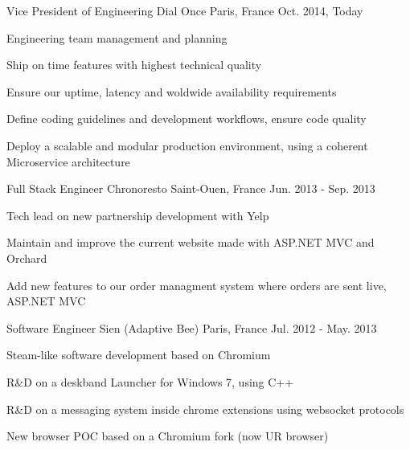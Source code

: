 

\begin{cventries}

  \cventry
    {Vice President of Engineering} %
    {Dial Once} %
    {Paris, France} %
    {Oct. 2014, Today} %
    {
      \begin{cvitems} %
        \item {Engineering team management and planning}
        \item {Ship on time features with highest technical quality}
        \item {Ensure our uptime, latency and woldwide availability requirements}
        \item {Define coding guidelines and development workflows, ensure code quality}
        \item {Deploy a scalable and modular production environment, using a coherent Microservice architecture}
      \end{cvitems}
    }

  \cventry
    {Full Stack Engineer} %
    {Chronoresto} %
    {Saint-Ouen, France} %
    {Jun. 2013 - Sep. 2013} %
    {
      \begin{cvitems} %
        \item {Tech lead on new partnership development with Yelp}
        \item {Maintain and improve the current website made with ASP.NET MVC and Orchard}
        \item {Add new features to our order managment system where orders are sent live, ASP.NET MVC}
      \end{cvitems}
    }

  \cventry
    {Software Engineer} %
    {Sien (Adaptive Bee)} %
    {Paris, France} %
    {Jul. 2012 - May. 2013} %
    {
      \begin{cvitems} %
        \item {Steam-like software development based on Chromium}
        \item {R\&D on a deskband Launcher for Windows 7, using C++ }
        \item {R\&D on a messaging system inside chrome extensions using websocket protocols}
        \item {New browser POC based on a Chromium fork (now UR browser)}
      \end{cvitems}
    }


\end{cventries}
